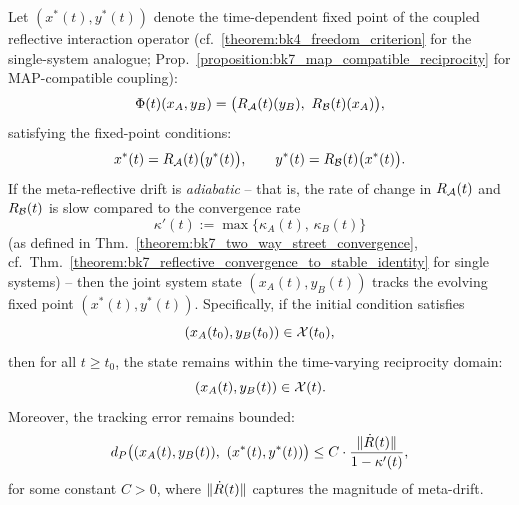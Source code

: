 \begin{corollary}
\label{corollary:bk7_fixed_point_tracking_within_evolving_reciprocity}
Let \( (x^*(t), y^*(t)) \) denote the time-dependent fixed point of the coupled reflective interaction operator (cf.~\ref{theorem:bk4_freedom_criterion} for the single-system analogue; Prop.~\ref{proposition:bk7_map_compatible_reciprocity} for MAP-compatible coupling):
\[
\Phi(t)(x_A, y_B) = \big( \reflect_{\mathcal{A}}(t)(y_B),\ \reflect_{\mathcal{B}}(t)(x_A) \big),
\]
satisfying the fixed-point conditions:
\[
x^*(t) = R_{\mathcal{A}}(t)\big(y^*(t)\big), 
\qquad 
y^*(t) = R_{\mathcal{B}}(t)\big(x^*(t)\big).
\]
If the meta-reflective drift is \emph{adiabatic} -- that is, the rate of change in 
\( R_{\mathcal{A}}(t) \) and \( R_{\mathcal{B}}(t) \) is slow compared to the 
convergence rate 
\[
\kappa'(t) := \max\{ \kappa_A(t),\, \kappa_B(t) \}
\]
(as defined in Thm.~\ref{theorem:bk7_two_way_street_convergence}, cf.~Thm.~\ref{theorem:bk7_reflective_convergence_to_stable_identity} 
for single systems) -- then the joint system state \( (x_A(t), y_B(t)) \) tracks 
the evolving fixed point \( (x^*(t), y^*(t)) \).
Specifically, if the initial condition satisfies
\[
(x_A(t_0), y_B(t_0)) \in \mathcal{X}(t_0),
\]
then for all \( t \geq t_0 \), the state remains within the time-varying reciprocity domain:
\[
(x_A(t), y_B(t)) \in \mathcal{X}(t).
\]
Moreover, the tracking error remains bounded:
\[
d_P\big( (x_A(t), y_B(t)),\ (x^*(t), y^*(t)) \big)
\le C \cdot \frac{\|\dot{R}(t)\|}{1 - \kappa'(t)},
\]
for some constant \( C > 0 \), where \( \|\dot{R}(t)\| \) captures the magnitude of meta-drift.
\end{corollary}
